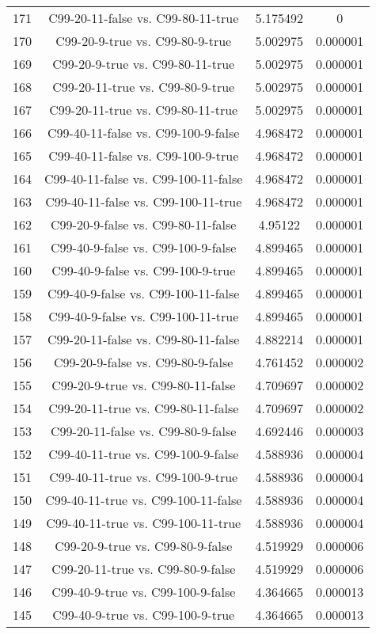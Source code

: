 \documentclass[a4paper,10pt]{article}
\begin{document}
\begin{landscape}
\begin{table}[!htp]
\begin{tabular}{cccc}
171&C99-20-11-false vs. C99-80-11-true&5.175492&0\\
170&C99-20-9-true vs. C99-80-9-true&5.002975&0.000001\\
169&C99-20-9-true vs. C99-80-11-true&5.002975&0.000001\\
168&C99-20-11-true vs. C99-80-9-true&5.002975&0.000001\\
167&C99-20-11-true vs. C99-80-11-true&5.002975&0.000001\\
166&C99-40-11-false vs. C99-100-9-false&4.968472&0.000001\\
165&C99-40-11-false vs. C99-100-9-true&4.968472&0.000001\\
164&C99-40-11-false vs. C99-100-11-false&4.968472&0.000001\\
163&C99-40-11-false vs. C99-100-11-true&4.968472&0.000001\\
162&C99-20-9-false vs. C99-80-11-false&4.95122&0.000001\\
161&C99-40-9-false vs. C99-100-9-false&4.899465&0.000001\\
160&C99-40-9-false vs. C99-100-9-true&4.899465&0.000001\\
159&C99-40-9-false vs. C99-100-11-false&4.899465&0.000001\\
158&C99-40-9-false vs. C99-100-11-true&4.899465&0.000001\\
157&C99-20-11-false vs. C99-80-11-false&4.882214&0.000001\\
156&C99-20-9-false vs. C99-80-9-false&4.761452&0.000002\\
155&C99-20-9-true vs. C99-80-11-false&4.709697&0.000002\\
154&C99-20-11-true vs. C99-80-11-false&4.709697&0.000002\\
153&C99-20-11-false vs. C99-80-9-false&4.692446&0.000003\\
152&C99-40-11-true vs. C99-100-9-false&4.588936&0.000004\\
151&C99-40-11-true vs. C99-100-9-true&4.588936&0.000004\\
150&C99-40-11-true vs. C99-100-11-false&4.588936&0.000004\\
149&C99-40-11-true vs. C99-100-11-true&4.588936&0.000004\\
148&C99-20-9-true vs. C99-80-9-false&4.519929&0.000006\\
147&C99-20-11-true vs. C99-80-9-false&4.519929&0.000006\\
146&C99-40-9-true vs. C99-100-9-false&4.364665&0.000013\\
145&C99-40-9-true vs. C99-100-9-true&4.364665&0.000013\\

\end{tabular}
\end{table}
\end{landscape}
\end{document}
